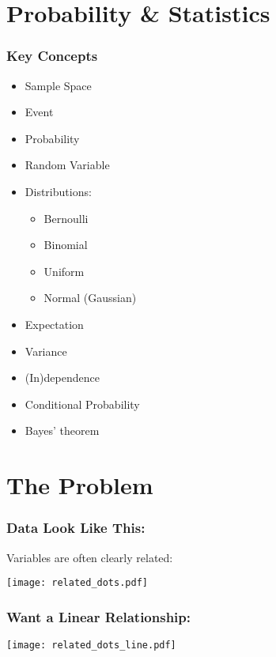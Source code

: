 \documentclass[mathserif, xcolor=table, svgnames]{beamer}
\begin{document}
\section{Probability \& Statistics}

\begin{frame}
  \frametitle{Key Concepts}
  \begin{itemize}
  \item Sample Space
  \item Event
  \item Probability
  \item Random Variable
  \item Distributions:
    \begin{itemize}
    \item Bernoulli
    \item Binomial
    \item Uniform
    \item Normal (Gaussian)
    \end{itemize}
  \item Expectation
  \item Variance
  \item (In)dependence
  \item Conditional Probability
  \item Bayes' theorem
  \end{itemize}
\end{frame}


\section[Problem]{The Problem}

\begin{frame}
  \frametitle{Data Look Like This:}
  Variables are often clearly related:
  \begin{center}
    \texttt{[image: related\_dots.pdf]}
  \end{center}
\end{frame}

\begin{frame}
  \frametitle{Want a Linear Relationship:}
  \begin{center}
    \texttt{[image: related\_dots\_line.pdf]}
  \end{center}
\end{frame}
\end{document}
